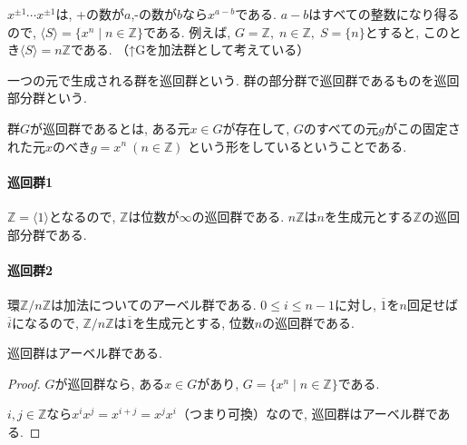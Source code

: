$x^{\pm 1}\cdots x^{\pm 1}$は, +の数が$a$,-の数が$b$なら$x^{a-b}$である.
$a-b$はすべての整数になり得るので,
$\langle S \rangle = \{x^n \mid n \in \mathbb{Z}\}$である.
例えば, $G=\mathbb{Z},\; n \in \mathbb{Z}, \; S=\{n\} $とすると,
このとき$\langle S \rangle=n\mathbb{Z}$である.
（↑Gを加法群として考えている）

\begin{dfn*}
	一つの元で生成される群を巡回群という.
	群の部分群で巡回群であるものを巡回部分群という.
\end{dfn*}
群$G$が巡回群であるとは, ある元$x \in G$が存在して,
$G$のすべての元$g$がこの固定された元$x$のべき$g=x^n\:(n \in \mathbb{Z})$
という形をしているということである.\\

\paragraph*{巡回群1}
$\mathbb{Z}=\langle 1 \rangle$となるので, 
$\mathbb{Z}$は位数が$\infty$の巡回群である.
$n\mathbb{Z}$は$n$を生成元とする$\mathbb{Z}$の巡回部分群である.\\

\paragraph*{巡回群2}
環$\mathbb{Z}/n\mathbb{Z}$は加法についてのアーベル群である.
$0\leq i \leq n-1$に対し, $\overline{1}$を$n$回足せば
$\overline{i}$になるので,
$\mathbb{Z}/n\mathbb{Z}$は$\overline{1}$を生成元とする,
位数$n$の巡回群である.\\

\begin{tcolorbox}
	\begin{prp*}
		巡回群はアーベル群である.
	\end{prp*}	
\end{tcolorbox}
\begin{proof}
	$G$が巡回群なら, ある$x \in G$があり,
	$G=\{x^n \mid n \in \mathbb{Z}\}$である.

	$i,j\in \mathbb{Z}$なら$x^i x^j =x^{i+j}=x^j x^i$（つまり可換）なので,
	巡回群はアーベル群である.
\end{proof}\leavevmode


